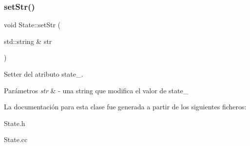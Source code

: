 \subsubsection{\texorpdfstring{set\+Str()}{setStr()}}
{\footnotesize\ttfamily void State\+::set\+Str (\begin{DoxyParamCaption}\item[{std\+::string \&}]{str }\end{DoxyParamCaption})}



Setter del atributo state\+\_\+. 


\begin{DoxyParams}{Parámetros}
{\em str} & -\/ una string que modifica el valor de state\+\_\+ \\
\hline
\end{DoxyParams}


La documentación para esta clase fue generada a partir de los siguientes ficheros\+:\begin{DoxyCompactItemize}
\item 
State.\+h\item 
State.\+cc\end{DoxyCompactItemize}

